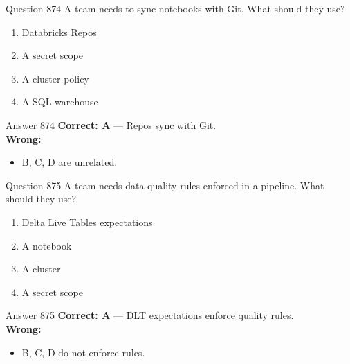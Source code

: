 \documentclass[aspectratio=169,11pt]{beamer}
\begin{document}
	\begin{frame}{Question 874}
		A team needs to sync notebooks with Git. What should they use?
		\begin{enumerate}[label=\Alph*.]
			\item Databricks Repos
			\item A secret scope
			\item A cluster policy
			\item A SQL warehouse
		\end{enumerate}
	\end{frame}
	\begin{frame}{Answer 874}
		\textbf{Correct: A} --- Repos sync with Git.\\
		\vspace{0.5em}
		\textbf{Wrong:}
		\begin{itemize}
			\item B, C, D are unrelated.
		\end{itemize}
	\end{frame}
	
	\begin{frame}{Question 875}
		A team needs data quality rules enforced in a pipeline. What should they use?
		\begin{enumerate}[label=\Alph*.]
			\item Delta Live Tables expectations
			\item A notebook
			\item A cluster
			\item A secret scope
		\end{enumerate}
	\end{frame}
	\begin{frame}{Answer 875}
		\textbf{Correct: A} --- DLT expectations enforce quality rules.\\
		\vspace{0.5em}
		\textbf{Wrong:}
		\begin{itemize}
			\item B, C, D do not enforce rules.
		\end{itemize}
	\end{frame}
	
\end{document}
